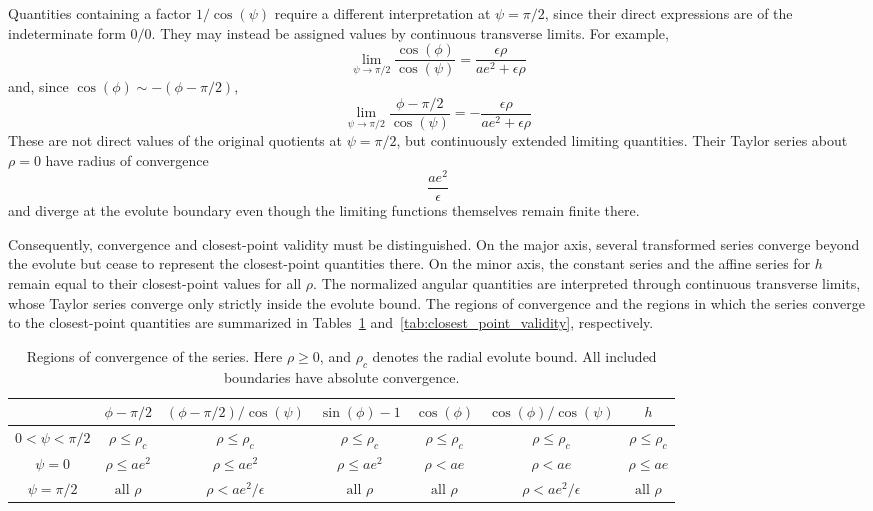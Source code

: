\documentclass[a4paper]{amsart}
\begin{document}
Quantities containing a factor $1/\cos(\psi)$ require a different interpretation at $\psi=\pi/2$, since their direct expressions are of the indeterminate form $0/0$. They may instead be assigned values by continuous transverse limits. For example,
\begin{equation*}
\lim_{\psi\to\pi/2}\frac{\cos(\phi)}{\cos(\psi)}
=
\frac{\epsilon\rho}{ae^2+\epsilon\rho}
\end{equation*}
and, since $\cos(\phi)\sim-(\phi-\pi/2)$,
\begin{equation*}
\lim_{\psi\to\pi/2}\frac{\phi-\pi/2}{\cos(\psi)}
=
-\frac{\epsilon\rho}{ae^2+\epsilon\rho}
\end{equation*}
These are not direct values of the original quotients at $\psi=\pi/2$, but continuously extended limiting quantities. Their Taylor series about $\rho=0$ have radius of convergence
\begin{equation*}
\frac{ae^2}{\epsilon}
\end{equation*}
and diverge at the evolute boundary even though the limiting functions themselves remain finite there.

Consequently, convergence and closest-point validity must be distinguished. On the major axis, several transformed series converge beyond the evolute but cease to represent the closest-point quantities there. On the minor axis, the constant series and the affine series for $h$ remain equal to their closest-point values for all $\rho$. The normalized angular quantities are interpreted through continuous transverse limits, whose Taylor series converge only strictly inside the evolute bound. The regions of convergence and the regions in which the series converge to the closest-point quantities are summarized in Tables~\ref{tab:convergence_regions} and~\ref{tab:closest_point_validity}, respectively.


\begin{table}[ht]
\centering
\caption{Regions of convergence of the series.
Here $\rho\geq0$, and $\rho_c$ denotes the radial evolute
bound. All included boundaries have absolute convergence.}
\small
\setlength{\tabcolsep}{4pt}
\label{tab:convergence_regions}
\begin{tabular}{c|c|c|c|c|c|c}
\hline
& $\phi-\pi/2$
& $(\phi\!-\!\pi/2)/\!\cos(\psi)$
& $\sin(\phi)\!-\!1$
& $\cos(\phi)$
& $\cos(\phi)/\!\cos(\psi)$
& $h$ \\
\hline
$0\!<\!\psi\!<\!\pi/2$
& $\rho\leq\rho_c$
& $\rho\leq\rho_c$
& $\rho\leq\rho_c$
& $\rho\leq\rho_c$
& $\rho\leq\rho_c$
& $\rho\leq\rho_c$
\\[1mm]
$\psi=0$
& $\rho\leq ae^2$
& $\rho\leq ae^2$
& $\rho\leq ae^2$
& $\rho<ae$
& $\rho<ae$
& $\rho\leq ae$
\\[1mm]
$\psi=\pi/2$
& $\text{all }\rho$
& $\rho<ae^2/\epsilon$
& $\text{all }\rho$
& $\text{all }\rho$
& $\rho<ae^2/\epsilon$
& $\text{all }\rho$
\\
\hline
\end{tabular}
\end{table}
\end{document}
